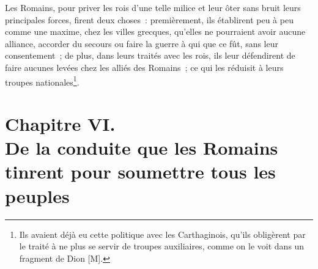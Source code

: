\documentclass[french,twoside]{book} %
\newcommand\chapteropen{} %
\newcommand\chapterclose{} %
\begin{document}
Les Romains, pour priver les rois d’une telle milice et leur ôter sans bruit leurs principales forces, firent deux choses : premièrement, ils établirent peu à peu comme une maxime, chez les villes grecques, qu’elles ne pourraient avoir aucune alliance, accorder du secours ou faire la guerre à qui que ce fût, sans leur consentement ; de plus, dans leurs traités avec les rois, ils leur défendirent de faire aucunes levées chez les alliés des Romains ; ce qui les réduisit à leurs troupes nationales\footnote{Ils avaient déjà eu cette politique avec les Carthaginois, qu’ils obligèrent par le traité à ne plus se servir de troupes auxiliaires, comme on le voit dans un fragment de Dion [M].}.
\chapterclose


\chapteropen
\chapter[{Chapitre VI. De la conduite que les Romains tinrent pour soumettre tous les peuples}]{Chapitre VI. \\
De la conduite que les Romains tinrent pour soumettre tous les peuples}
\label{considérations\_Romains\_chap\_06}\renewcommand{\leftmark}{Chapitre VI. \\
De la conduite que les Romains tinrent pour soumettre tous les peuples}
\end{document}
